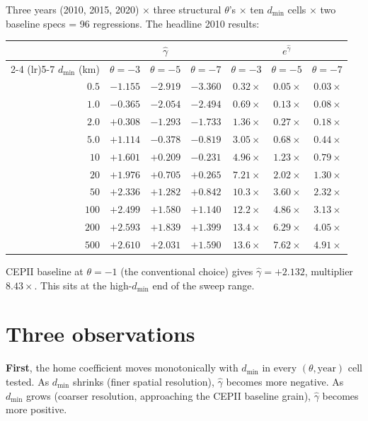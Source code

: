 \documentclass[11pt,letterpaper,oneside]{book}
\theoremstyle{definition}
\theoremstyle{remark}
\begin{document}
Three years (2010, 2015, 2020) $\times$ three structural $\theta$'s
$\times$ ten $d_{\min}$ cells $\times$ two baseline specs = 96
regressions. The headline 2010 results:

\begin{center}
\begin{tabular}{r r r r r r r}
\toprule
& \multicolumn{3}{c}{$\hat{\gamma}$} & \multicolumn{3}{c}{$e^{\hat{\gamma}}$} \\
\cmidrule(lr){2-4} \cmidrule(lr){5-7}
$d_{\min}$ (km) & $\theta = -3$ & $\theta = -5$ & $\theta = -7$ & $\theta = -3$ & $\theta = -5$ & $\theta = -7$ \\
\midrule
$0.5$ & $-1.155$ & $-2.919$ & $-3.360$ & $0.32\times$ & $0.05\times$ & $0.03\times$ \\
$1.0$ & $-0.365$ & $-2.054$ & $-2.494$ & $0.69\times$ & $0.13\times$ & $0.08\times$ \\
$2.0$ & $+0.308$ & $-1.293$ & $-1.733$ & $1.36\times$ & $0.27\times$ & $0.18\times$ \\
$5.0$ & $+1.114$ & $-0.378$ & $-0.819$ & $3.05\times$ & $0.68\times$ & $0.44\times$ \\
$10$  & $+1.601$ & $+0.209$ & $-0.231$ & $4.96\times$ & $1.23\times$ & $0.79\times$ \\
$20$  & $+1.976$ & $+0.705$ & $+0.265$ & $7.21\times$ & $2.02\times$ & $1.30\times$ \\
$50$  & $+2.336$ & $+1.282$ & $+0.842$ & $10.3\times$ & $3.60\times$ & $2.32\times$ \\
$100$ & $+2.499$ & $+1.580$ & $+1.140$ & $12.2\times$ & $4.86\times$ & $3.13\times$ \\
$200$ & $+2.593$ & $+1.839$ & $+1.399$ & $13.4\times$ & $6.29\times$ & $4.05\times$ \\
$500$ & $+2.610$ & $+2.031$ & $+1.590$ & $13.6\times$ & $7.62\times$ & $4.91\times$ \\
\bottomrule
\end{tabular}
\end{center}

CEPII baseline at $\theta = -1$ (the conventional choice) gives
$\hat{\gamma} = +2.132$, multiplier $8.43\times$. This sits at the
high-$d_{\min}$ end of the sweep range.

\section{Three observations}

\textbf{First}, the home coefficient moves monotonically with
$d_{\min}$ in every $(\theta, \text{year})$ cell tested. As $d_{\min}$
shrinks (finer spatial resolution), $\hat{\gamma}$ becomes more
negative. As $d_{\min}$ grows (coarser resolution, approaching the
CEPII baseline grain), $\hat{\gamma}$ becomes more positive.
\end{document}
